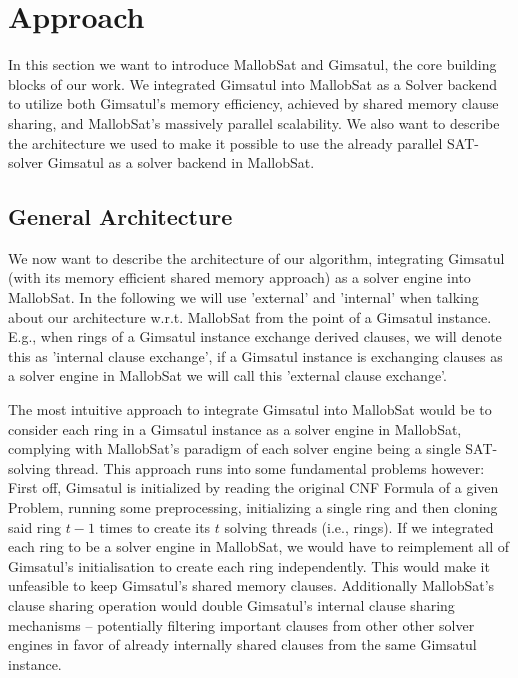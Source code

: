 \documentclass[12pt,a4paper,twoside]{scrartcl}
\numberwithin{equation}{section}
\begin{document}

\section{Approach}

In this section we want to introduce MallobSat and Gimsatul, the core building blocks of our work. We integrated Gimsatul into MallobSat as a Solver backend to utilize both Gimsatul's memory efficiency, achieved by shared memory clause sharing, and MallobSat's massively parallel scalability. We also want to describe the architecture we used to make it possible to use the already parallel SAT-solver Gimsatul as a solver backend in MallobSat.

\subsection{General Architecture}

We now want to describe the architecture of our algorithm, integrating Gimsatul (with its memory efficient shared memory approach) as a solver engine into MallobSat. In the following we will use 'external' and 'internal' when talking about our architecture w.r.t. MallobSat from the point of a Gimsatul instance. E.g., when rings of a Gimsatul instance exchange derived clauses, we will denote this as 'internal clause exchange', if a Gimsatul instance is exchanging clauses as a solver engine in MallobSat we will call this 'external clause exchange'.

The most intuitive approach to integrate Gimsatul into MallobSat would be to consider each ring in a Gimsatul instance as a solver engine in MallobSat, complying with MallobSat's paradigm of each solver engine being a single SAT-solving thread. This approach runs into some fundamental problems however: 
First off, Gimsatul is initialized by reading the original CNF Formula of a given Problem, running some preprocessing, initializing a single ring and then cloning said ring $t - 1$ times to create its $t$ solving threads (i.e., rings). If we integrated each ring to be a solver engine in MallobSat, we would have to reimplement all of Gimsatul's initialisation to create each ring independently. This would make it unfeasible to keep Gimsatul's shared memory clauses. Additionally MallobSat's clause sharing operation would double Gimsatul's internal clause sharing mechanisms -- potentially filtering important clauses from other other solver engines in favor of already internally shared clauses from the same Gimsatul instance.
\end{document}
